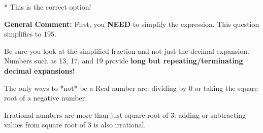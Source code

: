 \documentclass{extbook}[14pt]
\begin{document}
\begin{enumerate}
{\begin{enumerate}[label=\Alph*.]
* This is the correct option!
\end{enumerate}

\textbf{General Comment:} First, you \textbf{NEED} to simplify the expression. This question simplifies to $195$. 
 
 Be sure you look at the simplified fraction and not just the decimal expansion. Numbers such as 13, 17, and 19 provide \textbf{long but repeating/terminating decimal expansions!} 
 
 The only ways to *not* be a Real number are: dividing by 0 or taking the square root of a negative number. 
 
 Irrational numbers are more than just square root of 3: adding or subtracting values from square root of 3 is also irrational.
}
\end{enumerate}
\end{document}
